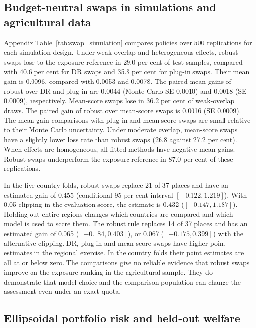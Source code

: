 \subsection{Budget-neutral swaps in simulations and agricultural data}\label{res:swaps}

Appendix Table~\ref{tab:swap_simulation} compares policies over 500 replications for each simulation
design. Under weak overlap and heterogeneous effects, robust swaps lose to the exposure
reference in 29.0 per cent of test samples, compared with 40.6 per cent for DR swaps and
35.8 per cent for plug-in swaps. Their mean gain is 0.0096, compared with 0.0053 and 0.0078.
The paired mean gains of robust over DR and plug-in are 0.0044 (Monte Carlo SE 0.0010)
and 0.0018 (SE 0.0009), respectively. Mean-score swaps lose in 36.2 per cent of
weak-overlap draws. The paired gain of robust over mean-score swaps is 0.0016
(SE 0.0009). The mean-gain comparisons with plug-in and mean-score swaps are small
relative to their Monte Carlo uncertainty. Under moderate overlap, mean-score swaps
have a slightly lower loss rate than robust swaps (26.8 against 27.2 per cent).
When effects are homogeneous, all fitted methods have negative mean gains. Robust
swaps underperform the exposure reference in 87.0 per cent of these replications.

In the five country folds, robust swaps replace 21 of 37 places and have an estimated
gain of 0.455 (conditional 95 per cent interval $[-0.122,1.219]$). With 0.05 clipping
in the evaluation score, the estimate is 0.432 ($[-0.147,1.187]$). Holding out entire
regions changes which countries are compared and which model is used to score them.
The robust rule replaces 14 of 37 places and has an estimated gain of 0.065
($[-0.184,0.403]$), or 0.067 ($[-0.175,0.399]$) with the alternative clipping.
DR, plug-in and mean-score swaps have higher point estimates in the regional
exercise. In the country folds their point estimates are all at or below zero.
The comparisons give no reliable evidence that robust swaps improve on the
exposure ranking in the agricultural sample. They do demonstrate that model choice
and the comparison population can change the assessment even under an exact quota.

\subsection{Ellipsoidal portfolio risk and held-out welfare}\label{res:ellipsoid}


